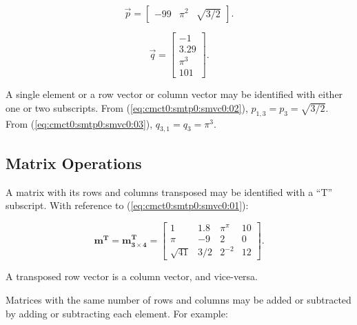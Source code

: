 \begin{equation}
\label{eq:cmct0:smtp0:smvc0:02}
\overrightarrow{p} = \left[ \begin{array}{ccc}
-99        & \pi^2 & \sqrt{3/2} 
\end{array}\right].
\end{equation}

\begin{equation}
\label{eq:cmct0:smtp0:smvc0:03}
\overrightarrow{q} = \left[ \begin{array}{c}
-1        \\
3.29      \\
\pi^3  \\
101
\end{array}\right].
\end{equation}

A single element or a row vector or column vector may be
identified with either one or two subscripts.
From (\ref{eq:cmct0:smtp0:smvc0:02}), $p_{1,3} = p_{3} = \sqrt{3/2}$.
From (\ref{eq:cmct0:smtp0:smvc0:03}), $q_{3,1} = q_{3} = \pi^3$.


\subsection{Matrix Operations}
\label{cmct0:smtp0:smop0}

A matrix with its rows and columns transposed may be identified with a ``T'' subscript.
With reference to (\ref{eq:cmct0:smtp0:smvc0:01}):

\begin{equation}
\label{eq:cmct0:smtp0:smop0:01}
\boldsymbol{m^T} = \boldsymbol{m_{3 \times 4}^T} = \left[ \begin{array}{cccc}
1         & 1.8      & \pi^\pi  & 10 \\
\pi       & -9       & 2        &  0 \\
\sqrt{41} & 3/2      & 2^{-2}   & 12
\end{array}\right].
\end{equation}

A transposed row vector is a column vector, and vice-versa.

Matrices with the same number of rows and columns may be added or subtracted by
adding or subtracting each
element.  For example:

